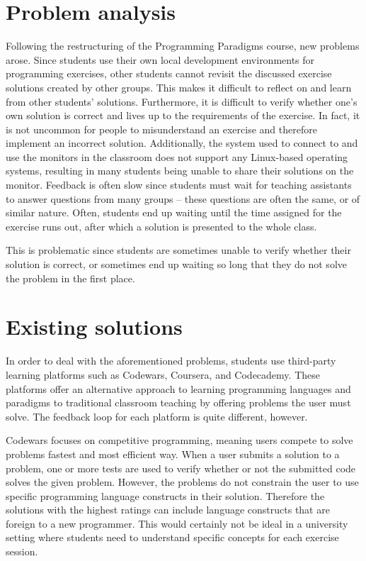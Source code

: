 \section{Problem analysis}
Following the restructuring of the Programming Paradigms course, new problems arose.
Since students use their own local development environments for programming exercises, other students cannot revisit the discussed exercise solutions created by other groups.
This makes it difficult to reflect on and learn from other students' solutions.
Furthermore, it is difficult to verify whether one's own solution is correct and lives up to the requirements of the exercise.
In fact, it is not uncommon for people to misunderstand an exercise and therefore implement an incorrect solution.
Additionally, the system used to connect to and use the monitors in the classroom does not support any Linux-based operating systems, resulting in many students being unable to share their solutions on the monitor.
Feedback is often slow since students must wait for teaching assistants to answer questions from many groups -- these questions are often the same, or of similar nature.
Often, students end up waiting until the time assigned for the exercise runs out, after which a solution is presented to the whole class.

This is problematic since students are sometimes unable to verify whether their solution is correct, or sometimes end up waiting so long that they do not solve the problem in the first place.

\section{Existing solutions}
In order to deal with the aforementioned problems, students use third-party learning platforms such as Codewars\cite{Codewars}, Coursera\cite{Coursera}, and Codecademy\cite{Codecademy}.
These platforms offer an alternative approach to learning programming languages and paradigms to traditional classroom teaching by offering problems the user must solve.
The feedback loop for each platform is quite different, however.


Codewars focuses on competitive programming, meaning users compete to solve problems fastest and most efficient way.
When a user submits a solution to a problem, one or more tests are used to verify whether or not the submitted code solves the given problem. 
However, the problems do not constrain the user to use specific programming language constructs in their solution.
Therefore the solutions with the highest ratings can include language constructs that are foreign to a new programmer. 
This would certainly not be ideal in a university setting where students need to understand specific concepts for each exercise session.


